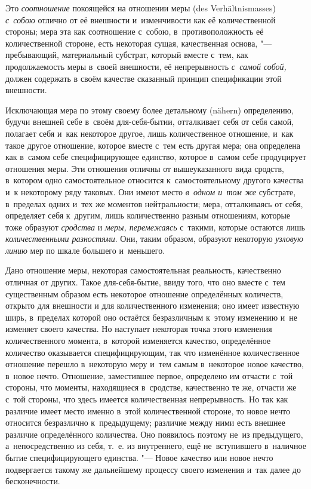 Это {\em соотношение} покоящейся на отношении меры (des Ver\-hält\-nis\-masses)
{\em с~собою} отлично от её внешности и~изменчивости как её количественной
стороны; мера эта как соотношение с~собою, в~противоположность её
количественной стороне, есть некоторая сущая, качественная основа, "---
пребывающий, материальный субстрат, который вместе с~тем, как продолжаемость
меры в~своей внешности, её непрерывность {\em с~самой собой,} должен содержать
в своём качестве сказанный принцип спецификации этой внешности.

Исключающая мера по этому своему более детальному (nähern) определению, будучи
внешней себе в~своём для-себя-бытии, отталкивает себя от себя самой, полагает
себя и~как некоторое другое, лишь количественное отношение, и~как такое другое
отношение, которое вместе с~тем есть другая мера; она определена как в~самом
себе специфицирующее единство, которое в~самом себе продуцирует отношения меры.
Эти отношения отличны от вышеуказанного вида сродств, в~котором одно
самостоятельное относится к~самостоятельному другого качества и~к некоторому
ряду таковых. Они имеют место {\em в~одном и~том же} субстрате, в~пределах
одних и~тех же моментов нейтральности; мера, отталкиваясь от себя, определяет
себя к~другим, лишь количественно разным отношениям, которые тоже образуют
{\em сродства} и {\em меры, перемежаясь} с~такими, которые остаются лишь
{\em количественными разностями}. Они, таким образом, образуют некоторую
{\em узловую линию} мер по шкале большего и~меньшего.

Дано отношение меры, некоторая самостоятельная реальность, качественно отличная
от других. Такое для-себя-бытие, ввиду того, что оно вместе с~тем существенным
образом есть некоторое отношение определённых количеств, открыто для внешности
и для количественного изменения; оно имеет известную ширь, в~пределах которой
оно остаётся безразличным к~этому изменению и~не изменяет своего качества. Но
наступает некоторая точка этого изменения количественного момента, в~которой
изменяется качество, определённое количество оказывается специфицирующим, так
что изменённое количественное отношение перешло в~некоторую меру и~тем самым
в~некоторое новое качество, в~новое нечто. Отношение, заместившее первое,
определено им отчасти с~той стороны, что моменты, находящиеся в~сродстве,
качественно те же, отчасти же с~той стороны, что здесь имеется количественная
непрерывность. Но так как различие имеет место именно в~этой количественной
стороне, то новое нечто относится безразлично к~предыдущему; различие между
ними есть внешнее различие определённого количества. Оно появилось поэтому
не~из предыдущего, а~непосредственно из себя, т.~е. из внутреннего, ещё
не~вступившего в~наличное бытие специфицирующего единства. "--- Новое качество
или новое нечто подвергается такому же дальнейшему процессу своего изменения
и~так далее до бесконечности.

